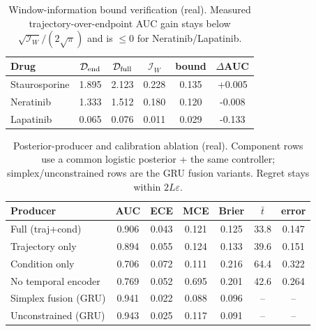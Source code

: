 \begin{table}[t]\centering\small\caption{Window-information bound verification (real). Measured trajectory-over-endpoint AUC gain stays below $\sqrt{\mathcal I_W}/(2\sqrt\pi)$ and is ${\le}0$ for Neratinib/Lapatinib.}\label{tab:bound}
\begin{tabular}{@{}lccccc@{}}\toprule
Drug & $\mathcal D_{\rm end}$ & $\mathcal D_{\rm full}$ & $\mathcal I_W$ & bound & $\Delta$AUC\\\midrule
Staurosporine & 1.895 & 2.123 & 0.228 & 0.135 & +0.005\\
Neratinib & 1.333 & 1.512 & 0.180 & 0.120 & -0.008\\
Lapatinib & 0.065 & 0.076 & 0.011 & 0.029 & -0.133\\
\bottomrule\end{tabular}\end{table}

\begin{table}[t]\centering\small\caption{Posterior-producer and calibration ablation (real). Component rows use a common logistic posterior + the same controller; simplex/unconstrained rows are the GRU fusion variants. Regret stays within $2L\varepsilon$.}\label{tab:ablation}
\begin{tabular}{@{}lcccccc@{}}\toprule
Producer & AUC & ECE & MCE & Brier & $\bar t$ & error\\\midrule
Full (traj+cond) & 0.906 & 0.043 & 0.121 & 0.125 & 33.8 & 0.147\\
Trajectory only & 0.894 & 0.055 & 0.124 & 0.133 & 39.6 & 0.151\\
Condition only & 0.706 & 0.072 & 0.111 & 0.216 & 64.4 & 0.322\\
No temporal encoder & 0.769 & 0.052 & 0.695 & 0.201 & 42.6 & 0.264\\
Simplex fusion (GRU) & 0.941 & 0.022 & 0.088 & 0.096 & -- & --\\
Unconstrained (GRU) & 0.943 & 0.025 & 0.117 & 0.091 & -- & --\\
\bottomrule\end{tabular}\end{table}

